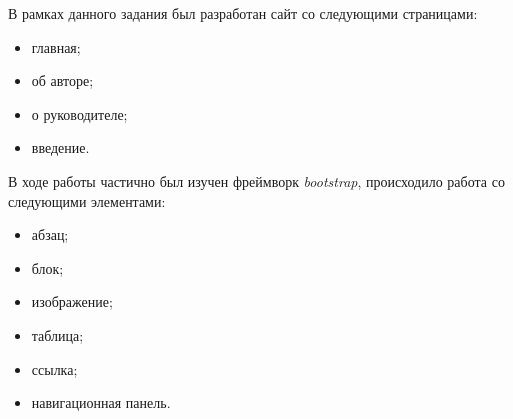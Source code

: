 
В рамках данного задания был разработан сайт со следующими страницами:
\begin{itemize}
	\item главная;
	\item об авторе;
	\item о руководителе;
	\item введение.
\end{itemize}

В ходе работы частично был изучен фреймворк \textit{bootstrap}, происходило работа со следующими элементами:
\begin{itemize}
	\item абзац;
	\item блок;
	\item изображение;
	\item таблица;
	\item ссылка;
	\item навигационная панель.
\end{itemize}
